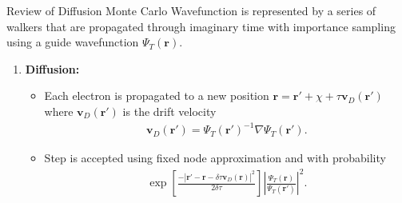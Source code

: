 \documentclass{beamer}
\begin{document}
\begin{frame}{Review of Diffusion Monte Carlo}
  Wavefunction is represented by a series of walkers that are propagated through imaginary time with importance sampling using a guide wavefunction  $\Psi_T(\mathbf{r})$.
  \begin{enumerate}
    \item{\textbf{Diffusion:} 
      \begin{itemize}
      \item Each electron is propagated to a new position $\mathbf{r} = \mathbf{r}' + \chi + \tau \mathbf{v}_D(\mathbf{r}')$ where $\mathbf{v}_D(\mathbf{r}')$ is the drift velocity 
    \small{\begin{align}
      \label{DriftVelocity}
      \mathbf{v}_D(\mathbf{r}') = \Psi_T(\mathbf{r}')^{-1} \nabla \Psi_T(\mathbf{r}').
    \end{align}}%
    \item Step is accepted using fixed node approximation and with probability 
     \small{\begin{align}
     \label{Paccept}
        \exp \left[ \frac{-\left| \mathbf{r}'-\mathbf{r} - \delta \tau \mathbf{v}_D (\mathbf{r}) \right| ^2}{2 \delta \tau} \right] \left| \frac{\Psi_T(\mathbf{r})}{\Psi_T(\mathbf{r}')} \right| ^2.
     \end{align}}%
     \end{itemize}}%
  \end{enumerate}
\end{frame}
\end{document}
